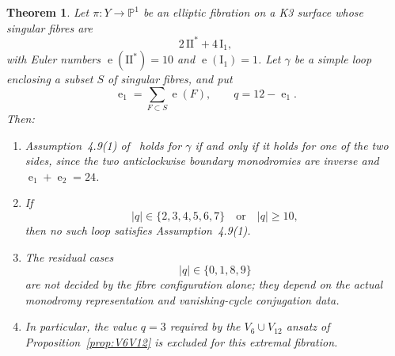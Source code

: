 \documentclass[12pt]{article}
\theoremstyle{plain}
\newtheorem{theorem}{Theorem}[section]
\theoremstyle{definition}
\DeclareMathOperator{\eul}{e}
\newcommand{\bP}{\mathbb{P}}
\begin{document}
\begin{theorem}\label{thm:extremal-obstruction}
Let $\pi\colon Y\to \bP^1$ be an elliptic fibration on a K3 surface whose singular fibres are
\[
2\,\mathrm{II}^*+4\,\mathrm{I}_1,
\]
with Euler numbers $\eul(\mathrm{II}^*)=10$ and $\eul(\mathrm{I}_1)=1$.  Let $\gamma$ be a simple loop enclosing a subset $S$ of singular fibres, and put
\[
\eul_1 = \sum_{F\subset S} \eul(F),\qquad q=12-\eul_1.
\]
Then:
\begin{enumerate}
\item Assumption~4.9(1) of~\cite{GT24} holds for $\gamma$ if and only if it holds for one of the two sides, since the two anticlockwise boundary monodromies are inverse and $\eul_1+\eul_2=24$.
\item If
\[
|q|\in \{2,3,4,5,6,7\}
\quad\text{or}\quad
|q|\geq 10,
\]
then no such loop satisfies Assumption~4.9(1).
\item The residual cases
\[
|q|\in\{0,1,8,9\}
\]
are not decided by the fibre configuration alone; they depend on the actual monodromy representation and vanishing-cycle conjugation data.
\item In particular, the value $q=3$ required by the $V_6\cup V_{12}$ ansatz of Proposition~\ref{prop:V6V12} is excluded for this extremal fibration.
\end{enumerate}
\end{theorem}
\end{document}
